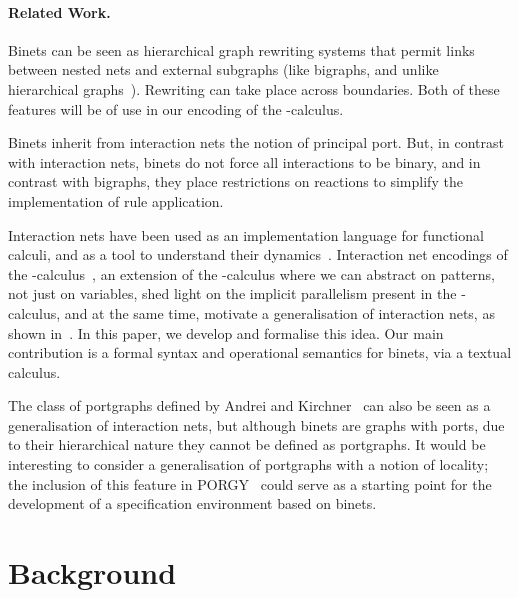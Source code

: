 \documentclass[copyright,creativecommons]{eptcs}
\begin{document}
\paragraph{Related Work.}
Binets can be seen as hierarchical graph rewriting systems that permit
links between nested nets and external subgraphs (like bigraphs, and
unlike hierarchical graphs~\cite{Drewes-Hoffmann-Plump:00}). Rewriting
can take place across boundaries.  Both of these features will be of
use in our encoding of the -calculus.

Binets inherit from interaction nets the notion of principal
port. But, in contrast with interaction nets, binets do not force all
interactions to be binary, and in contrast with bigraphs, they place
restrictions on reactions to simplify the implementation of rule application.

Interaction nets have been used as an implementation language for
functional calculi, and as a tool to understand their
dynamics~\cite{GonthierG:geoolr,AspertiA:bolhom,MackieIC:phd,MackieIC:efflei,FernandezM:terrgi,FernandezM:inMCpa,FleutotF:encoci}.
Interaction net encodings of the
-calculus~\cite{rhoCalIGLP-I+II-2001}, an extension of the
-calculus where we can abstract on patterns, not just on
variables, shed light on the implicit parallelism present in the
-calculus, and at the same time, motivate a generalisation of
interaction nets, as shown in~\cite{EXPRESS}.  In this paper, we
develop and formalise this idea. Our main contribution is a formal
syntax and operational semantics for binets, via a textual calculus.

The class of portgraphs defined by Andrei and Kirchner~\cite{AndreiK08}
can also be seen as a generalisation of interaction nets, but although
binets are graphs with ports, due to their hierarchical nature they
cannot be defined as portgraphs. It would be interesting to consider a
generalisation of portgraphs with a notion of locality; the inclusion
of this feature in PORGY~\cite{AndreiO:PORGY} could serve as a
starting point for the development of a specification environment
based on binets.



\section{Background}
\label{sec:bg}
\end{document}
